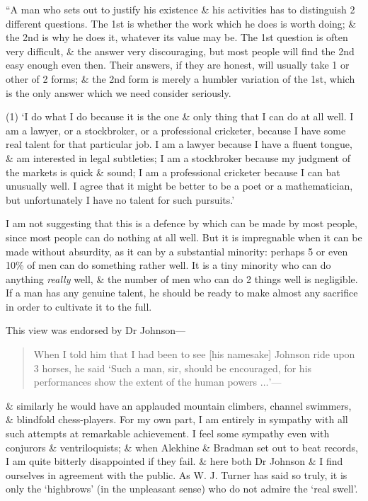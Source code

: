 \documentclass{article}
\numberwithin{equation}{section}
\begin{document}
 ``A man who sets out to justify his existence \& his activities has to distinguish 2 different questions. The 1st is whether the work which he does is worth doing; \& the 2nd is why he does it, whatever its value may be. The 1st question is often very difficult, \& the answer very discouraging, but most people will find the 2nd easy enough even then. Their answers, if they are honest, will usually take 1 or other of 2 forms; \& the 2nd form is merely a humbler variation of the 1st, which is the only answer which we need consider seriously.

(1) `I do what I do because it is the one \& only thing that I can do at all well. I am a lawyer, or a stockbroker, or a professional cricketer, because I have some real talent for that particular job. I am a lawyer because I have a fluent tongue, \& am interested in legal subtleties; I am a stockbroker because my judgment of the markets is quick \& sound; I am a professional cricketer because I can bat unusually well. I agree that it might be better to be a poet or a mathematician, but unfortunately I have no talent for such pursuits.'

I am not suggesting that this is a defence by which can be made by most people, since most people can do nothing at all well. But it is impregnable when it can be made without absurdity, as it can by a substantial minority: perhaps 5 or even 10\% of men can do something rather well. It is a tiny minority who can do anything \textit{really} well, \& the number of men who can do 2 things well is negligible. If a man has any genuine talent, he should be ready to make almost any sacrifice in order to cultivate it to the full.

This view was endorsed by Dr Johnson---
\begin{quotation}
	When I told him that I had been to see [his namesake] Johnson ride upon 3 horses, he said `Such a man, sir, should be encouraged, for his performances show the extent of the human powers $\ldots$'---
\end{quotation}
\& similarly he would have an applauded mountain climbers, channel swimmers, \& blindfold chess-players. For my own part, I am entirely in sympathy with all such attempts at remarkable achievement. I feel some sympathy even with conjurors \& ventriloquists; \& when Alekhine \& Bradman set out to beat records, I am quite bitterly disappointed if they fail. \& here both Dr Johnson \& I find ourselves in agreement with the public. As W. J. Turner has said so truly, it is only the `highbrows' (in the unpleasant sense) who do not admire the `real swell'.
\end{document}
